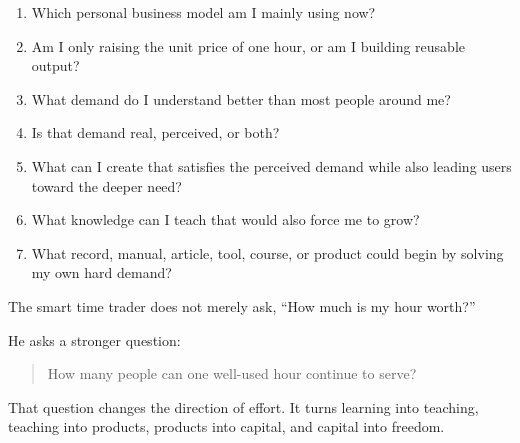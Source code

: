 \begin{enumerate}
\item Which personal business model am I mainly using now?
\item Am I only raising the unit price of one hour, or am I building reusable output?
\item What demand do I understand better than most people around me?
\item Is that demand real, perceived, or both?
\item What can I create that satisfies the perceived demand while also leading users toward the deeper need?
\item What knowledge can I teach that would also force me to grow?
\item What record, manual, article, tool, course, or product could begin by solving my own hard demand?
\end{enumerate}

The smart time trader does not merely ask, ``How much is my hour worth?''

He asks a stronger question:

\begin{quote}
How many people can one well-used hour continue to serve?
\end{quote}

That question changes the direction of effort. It turns learning into teaching, teaching into products, products into capital, and capital into freedom.

